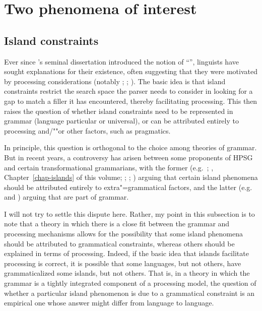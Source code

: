 \documentclass[output=paper
 	        ,biblatex
                ,babelshorthands
                ,newtxmath
                ,draftmode
                ,colorlinks, citecolor=brown
]{langscibook}
\begin{document}
\section{Two phenomena of interest}
\label{sec-phenomena-processing}

\subsection{Island constraints}

Ever since \citeauthor{Ross67}'s seminal dissertation \citeyearpar{Ross67} introduced the notion of
``'', linguists have sought explanations for their existence, often
suggesting that they were motivated by processing considerations (notably \citealt{Grosu72-u};
\citealt{Fodor83}; \citealt{Deane91}).  The basic idea is that island constraints restrict the
search space the parser needs to consider in looking for a gap to match a filler it has encountered,
thereby facilitating processing.  This then raises the question of whether island constraints need
to be represented in grammar (language particular or universal), or can be attributed entirely to
processing and/""or other factors, such as pragmatics.

In principle, this question is orthogonal to the choice among theories of grammar.  But in recent
years, a controversy has arisen between some proponents of HPSG and certain transformational
grammarians, with the former (e.g.\ \citealp{Chaves2012}; \citeyear{chapters/islands}, Chapter~\ref{chap-islands} of this volume; \citealt{HofmeisterSag2010};
\citealt*{HofmeisterEtal2013}; ) arguing that certain island phenomena should be attributed entirely
to extra"=grammatical factors, and the latter (e.g.\ \citealt{Phillips2013} and
\citealt{SWP2012a-u}) arguing that  are part of grammar. 

I will not try to settle this dispute here.  Rather, my point in this subsection is to note that a
theory in which there is a close fit between the grammar and processing mechanisms allows for the
possibility that some island phenomena should be attributed to grammatical constraints, whereas
others should be explained in terms of processing.  Indeed, if the basic idea that islands
facilitate processing is correct, it is possible that some languages, but not others, have
grammaticalized some islands, but not others.  That is, in a theory in which the grammar is a
tightly integrated component of a processing model, the question of whether a particular island
phenomenon is due to a grammatical constraint is an empirical one whose answer might differ from
language to language.  
\end{document}
